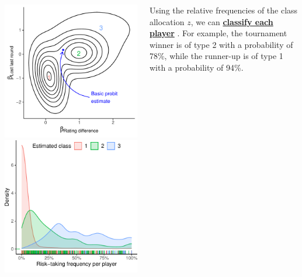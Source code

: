 \documentclass[25pt, a0paper, portrait]{tikzposter}
\renewcommand{\emph}[1]{
  \underline{\textcolor{Oeko}{\Large{\textbf{#1}}}}
}
\begin{document}
\begin{columns}
{\begin{minipage}[c]{\linewidth}
  \includegraphics[width=0.5\linewidth]{poster/oelschlaeger-mixing-distr.pdf}
  \includegraphics[width=0.5\linewidth]{poster/oelschlaeger-kd-berserk-fr.pdf}
\end{minipage}
\par\vspace{4ex}
%
Using the relative frequencies of the class allocation $z$, we can \emph{classify each player}. For example, the tournament winner is of type 2 with a probability of 78\%, while the runner-up is of type 1 with a probability of 94\%.
}



\end{columns}
\end{document}
